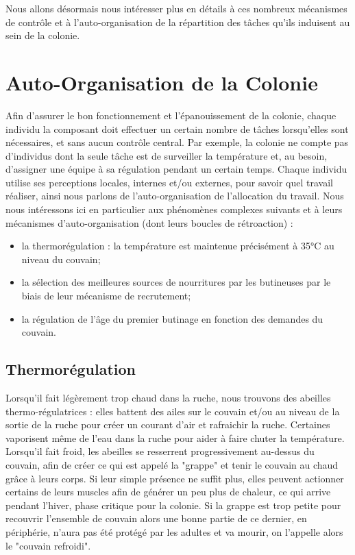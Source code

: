 			Nous allons désormais nous intéresser plus en détails à ces nombreux mécanismes de contrôle et à l'auto-organisation de la répartition des tâches qu'ils induisent au sein de la colonie.
			
		\section{Auto-Organisation de la Colonie}
			Afin d'assurer le bon fonctionnement et l'épanouissement de la colonie, chaque individu la composant doit effectuer un certain nombre de tâches lorsqu'elles sont nécessaires, et sans aucun contrôle central. Par exemple, la colonie ne compte pas d'individus dont la seule tâche est de surveiller la température et, au besoin, d'assigner une équipe à sa régulation pendant un certain temps. Chaque individu utilise ses perceptions locales, internes et/ou externes, pour savoir quel travail réaliser, ainsi nous parlons de l'auto-organisation de l'allocation du travail. Nous nous intéressons ici en particulier aux phénomènes complexes suivants et à leurs mécanismes d'auto-organisation (dont leurs boucles de rétroaction) :
			
			
			\begin{itemize}
				\item la thermorégulation : la température est maintenue précisément à 35°C au niveau du couvain;
				\item la sélection des meilleures sources de nourritures par les butineuses par le biais de leur mécanisme de recrutement;
				\item la régulation de l'âge du premier butinage en fonction des demandes du couvain.
			\end{itemize}

			\subsection{Thermorégulation}	
			
			Lorsqu'il fait légèrement trop chaud dans la ruche, nous trouvons des abeilles thermo-régulatrices : elles battent des ailes sur le couvain et/ou au niveau de la sortie de la ruche pour créer un courant d'air et rafraichir la ruche. Certaines vaporisent même de l'eau dans la ruche pour aider à faire chuter la température. Lorsqu'il fait froid, les abeilles se resserrent progressivement au-dessus du couvain, afin de créer ce qui est appelé la "grappe" et tenir le couvain au chaud grâce à leurs corps. Si leur simple présence ne suffit plus, elles peuvent actionner certains de leurs muscles afin de générer un peu plus de chaleur, ce qui arrive pendant l'hiver, phase critique pour la colonie. Si la grappe est trop petite pour recouvrir l'ensemble de couvain alors une bonne partie de ce dernier, en périphérie, n'aura pas été protégé par les adultes et va mourir, on l'appelle alors le "couvain refroidi".
					
